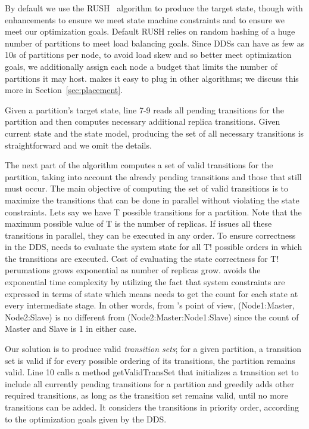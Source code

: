 By default we use the RUSH~\cite{honicky04} algorithm to produce the target state,
though with enhancements to ensure we meet state machine constraints and to
ensure we meet our optimization goals.  Default RUSH relies on
random hashing of a huge number of partitions to meet load balancing goals.
Since DDSs can have as few as 10s of partitions per node, to avoid load skew and
so better meet optimization goals, we
additionally assign each node a budget that limits the number of partitions it
may host.  \helix makes it easy to plug in other algorithms; we
discuss this more in Section~\ref{sec:placement}.

Given a partition's target state, line 7-9 reads all pending transitions for the
partition and then computes necessary additional replica transitions.
Given current state and the state model, producing the set of all necessary
transitions is straightforward
and we omit the details.


The next part of the algorithm computes a set of valid transitions for the
partition, taking into account the already pending transitions and those that
still must occur. The main objective of computing the set of valid transitions is to maximize the 
transitions that can be done in parallel without violating the state constraints. 
Lets say we have T possible transitions for a partition. Note that the maximum possible value of T
 is the number of replicas. If \helix issues all these transitions in parallel,
 they can be executed in any order.
To ensure correctness in the DDS, \helix needs to evaluate the system state
for all T! possible orders in which the transitions are executed. Cost of evaluating
the state correctness for T! perumations grows exponential as number of replicas
grow. \helix avoids the exponential time complexity by utilizing the fact that
system constraints are expressed in terms of state which means \helix needs to 
get the count for each state at every intermediate stage.
 In other words, from \helix's point of view, (Node1:Master, Node2:Slave) is no
 different from (Node2:Master:Node1:Slave) since the count of Master and Slave is 1 in either case.

Our solution is to produce valid \emph{transition sets}; for a given
partition, a transition set is valid if
for every possible ordering of its transitions, the partition remains valid.    
Line 10 calls a method getValidTransSet that initializes a
transition set to include all
currently pending transitions for a partition and greedily adds other required
transitions, as long as the transition set remains valid, until no more
transitions can be added.  It considers the transitions in priority order,
according to the optimization goals given by the DDS.


